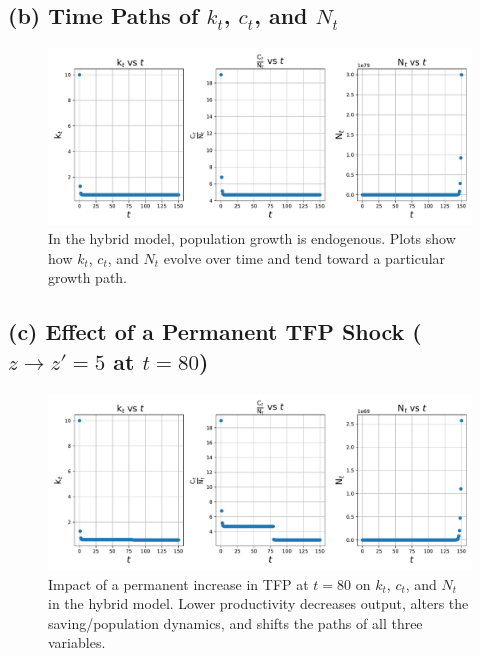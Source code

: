 \documentclass[12pt]{article}
\begin{document}
    \subsection*{(b) Time Paths of $k_t$, $c_t$, and $N_t$}
    \begin{figure}[H]
        \centering
        \includegraphics[width=1\textwidth]{3(b).pdf}
        \caption{In the hybrid model, population growth is endogenous. 
        Plots show how $k_t$, $c_t$, and $N_t$ evolve over time 
        and tend toward a particular growth path.}
        \label{fig:3(b)}
    \end{figure}
    
    \subsection*{(c) Effect of a Permanent TFP Shock ($z \to z'=5$ at $t=80$)}
    \begin{figure}[H]
        \centering
        \includegraphics[width=1\textwidth]{3(c).pdf}
        \caption{Impact of a permanent increase in TFP at $t=80$ on $k_t$, $c_t$, and $N_t$ 
        in the hybrid model. Lower productivity decreases output, alters the saving/population 
        dynamics, and shifts the paths of all three variables.}
        \label{fig:3(c)}
    \end{figure}
    
\end{document}
